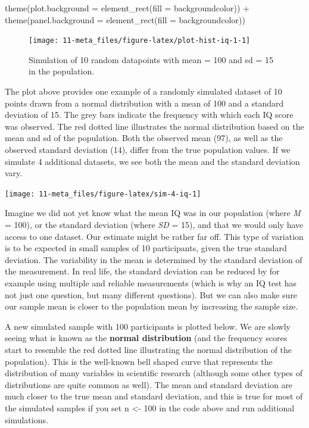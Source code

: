 \documentclass[
  oneside]{book}
\newenvironment{Shaded}{\begin{snugshade}}{\end{snugshade}}
\newcommand{\AttributeTok}[1]{\textcolor[rgb]{0.77,0.63,0.00}{#1}}
\newcommand{\FunctionTok}[1]{\textcolor[rgb]{0.00,0.00,0.00}{#1}}
\newcommand{\NormalTok}[1]{#1}
\newcommand{\SpecialCharTok}[1]{\textcolor[rgb]{0.00,0.00,0.00}{#1}}
\begin{document}
\begin{Shaded}
\begin{Highlighting}[]
  \FunctionTok{theme}\NormalTok{(}\AttributeTok{plot.background =} \FunctionTok{element\_rect}\NormalTok{(}\AttributeTok{fill =}\NormalTok{ backgroundcolor))  }\SpecialCharTok{+} 
  \FunctionTok{theme}\NormalTok{(}\AttributeTok{panel.background =} \FunctionTok{element\_rect}\NormalTok{(}\AttributeTok{fill =}\NormalTok{ backgroundcolor))}
\end{Highlighting}
\end{Shaded}

\begin{figure}

{\centering \texttt{[image: 11-meta\_files/figure-latex/plot-hist-iq-1-1]} 

}

\caption{Simulation of 10 random datapoints with mean = 100 and sd = 15 in the population.}\label{fig:plot-hist-iq-1}
\end{figure}

The plot above provides one example of a randomly simulated dataset of 10 points drawn from a normal distribution with a mean of 100 and a standard deviation of 15. The grey bars indicate the frequency with which each IQ score was observed. The red dotted line illustrates the normal distribution based on the mean and sd of the population. Both the observed mean (97), as well as the observed standard deviation (14), differ from the true population values. If we simulate 4 additional datasets, we see both the mean and the standard deviation vary.

\begin{center}\texttt{[image: 11-meta\_files/figure-latex/sim-4-iq-1]} \end{center}

Imagine we did not yet know what the mean IQ was in our population (where \emph{M} = 100), or the standard deviation (where \emph{SD} = 15), and that we would only have access to one dataset. Our estimate might be rather far off. This type of variation is to be expected in small samples of 10 participants, given the true standard deviation. The variability in the mean is determined by the standard deviation of the measurement. In real life, the standard deviation can be reduced by for example using multiple and reliable measurements (which is why an IQ test has not just one question, but many different questions). But we can also make sure our sample mean is closer to the population mean by increasing the sample size.

A new simulated sample with 100 participants is plotted below. We are slowly seeing what is known as the \textbf{normal distribution} (and the frequency scores start to resemble the red dotted line illustrating the normal distribution of the population). This is the well-known
bell shaped curve that represents the distribution of many variables in scientific research (although some other types of distributions are quite common as well). The mean and standard deviation are much closer to the true mean and standard deviation, and this is true for most of the simulated samples if you set n \textless- 100 in the code above and run additional simulations.
\end{document}
